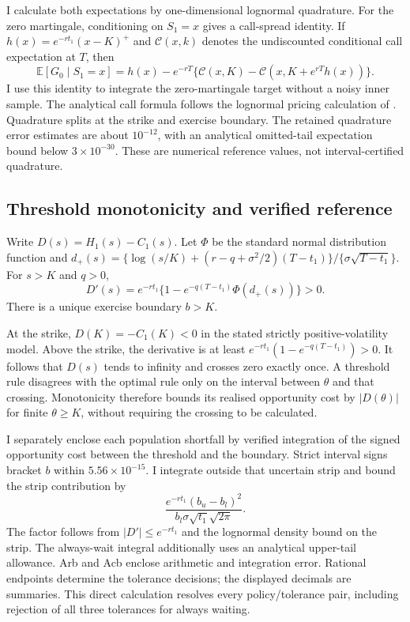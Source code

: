 \documentclass[11pt]{article}
\newcommand{\E}{\mathbb E}
\begin{document}
I calculate both expectations by one-dimensional lognormal quadrature. For the zero martingale, conditioning on $S_1=x$ gives a call-spread identity. If $h(x)=e^{-rt_1}(x-K)^+$ and $\mathcal C(x,k)$ denotes the undiscounted conditional call expectation at $T$, then
\begin{equation}
 \E[G_0\mid S_1=x]
 =h(x)-e^{-rT}\{\mathcal C(x,K)-\mathcal C(x,K+e^{rT}h(x))\}.
\end{equation}
I use this identity to integrate the zero-martingale target without a noisy inner sample. The analytical call formula follows the lognormal pricing calculation of \citet{black1973}. Quadrature splits at the strike and exercise boundary. The retained quadrature error estimates are about $10^{-12}$, with an analytical omitted-tail expectation bound below $3\times10^{-30}$. These are numerical reference values, not interval-certified quadrature.

\subsection{Threshold monotonicity and verified reference}
\label{app:threshold-reference}

Write $D(s)=H_1(s)-C_1(s)$. Let $\Phi$ be the standard normal distribution function and $d_+(s)=\{\log(s/K)+(r-q+\sigma^2/2)(T-t_1)\}/\{\sigma\sqrt{T-t_1}\}$. For $s>K$ and $q>0$,
\begin{equation}
 D'(s)=e^{-rt_1}\{1-e^{-q(T-t_1)}\Phi(d_+(s))\}>0.
\end{equation}
There is a unique exercise boundary $b>K$.

At the strike, $D(K)=-C_1(K)<0$ in the stated strictly positive-volatility model. Above the strike, the derivative is at least $e^{-rt_1}(1-e^{-q(T-t_1)})>0$. It follows that $D(s)$ tends to infinity and crosses zero exactly once. A threshold rule disagrees with the optimal rule only on the interval between $\theta$ and that crossing. Monotonicity therefore bounds its realised opportunity cost by $|D(\theta)|$ for finite $\theta\geq K$, without requiring the crossing to be calculated.

I separately enclose each population shortfall by verified integration of the signed opportunity cost between the threshold and the boundary. Strict interval signs bracket $b$ within $5.56\times10^{-15}$. I integrate outside that uncertain strip and bound the strip contribution by
\begin{equation}
 \frac{e^{-rt_1}(b_u-b_l)^2}
 {b_l\sigma\sqrt{t_1}\sqrt{2\pi}}.
\end{equation}
The factor follows from $|D'|\leq e^{-rt_1}$ and the lognormal density bound on the strip. The always-wait integral additionally uses an analytical upper-tail allowance. Arb and Acb enclose arithmetic and integration error. Rational endpoints determine the tolerance decisions; the displayed decimals are summaries. This direct calculation resolves every policy/tolerance pair, including rejection of all three tolerances for always waiting.
\end{document}
